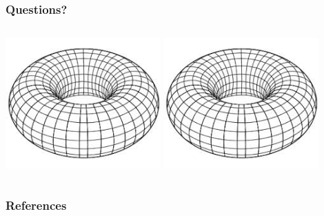 \documentclass[13pt]{beamer}
\begin{document}
\begin{frame}
\frametitle{Questions?}
   \begin{columns}[c] %
     \centering
     \includegraphics[height=5cm]{./img/torus} %
     \centering
     \includegraphics[height=5cm]{./img/torus} %
  \end{columns}
\end{frame}

 \begin{frame}[allowframebreaks]
  \frametitle{References} 
  \scriptsize{}
  
\end{frame}
\end{document}
